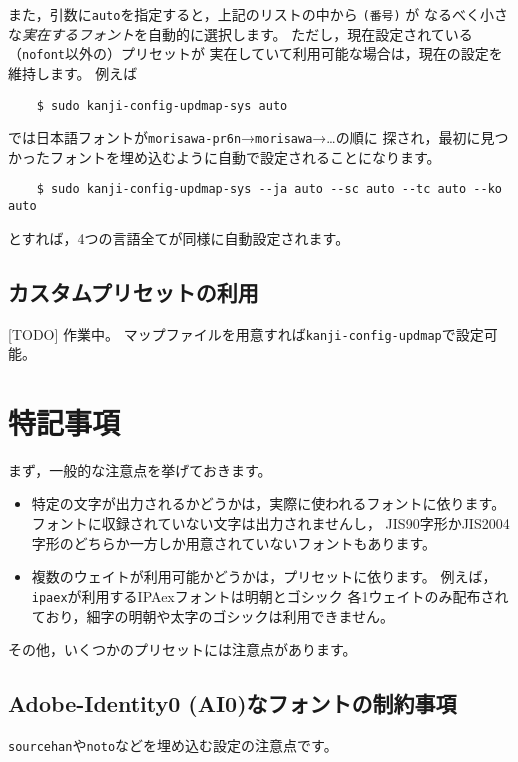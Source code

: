 \documentclass{jlreq}
\def\command#1{\texttt{#1}}
\begin{document}
また，引数に\command{auto}を指定すると，上記のリストの中から \command{(番号)} が
なるべく小さな\emph{実在するフォント}を自動的に選択します。
ただし，現在設定されている（\command{nofont}以外の）プリセットが
実在していて利用可能な場合は，現在の設定を維持します。
例えば
\begin{verbatim}
    $ sudo kanji-config-updmap-sys auto
\end{verbatim}
では日本語フォントが\command{morisawa-pr6n}→\command{morisawa}→…の順に
探され，最初に見つかったフォントを埋め込むように自動で設定されることになります。
\begin{verbatim}
    $ sudo kanji-config-updmap-sys --ja auto --sc auto --tc auto --ko auto
\end{verbatim}
とすれば，4つの言語全てが同様に自動設定されます。

\subsection{カスタムプリセットの利用}

[TODO] 作業中。
マップファイルを用意すれば\command{kanji-config-updmap}で設定可能。


\clearpage


\section{特記事項}

まず，一般的な注意点を挙げておきます。
\begin{itemize}
  \item 特定の文字が出力されるかどうかは，実際に使われるフォントに依ります。
        フォントに収録されていない文字は出力されませんし，
        JIS90字形かJIS2004字形のどちらか一方しか用意されていないフォントもあります。
  \item 複数のウェイトが利用可能かどうかは，プリセットに依ります。
        例えば，\command{ipaex}が利用するIPAexフォントは明朝とゴシック
        各1ウェイトのみ配布されており，細字の明朝や太字のゴシックは利用できません。
\end{itemize}

その他，いくつかのプリセットには注意点があります。

\subsection{Adobe-Identity0 (AI0)なフォントの制約事項}\label{ai0}

\command{sourcehan}や\command{noto}などを埋め込む設定の注意点です。
\end{document}
